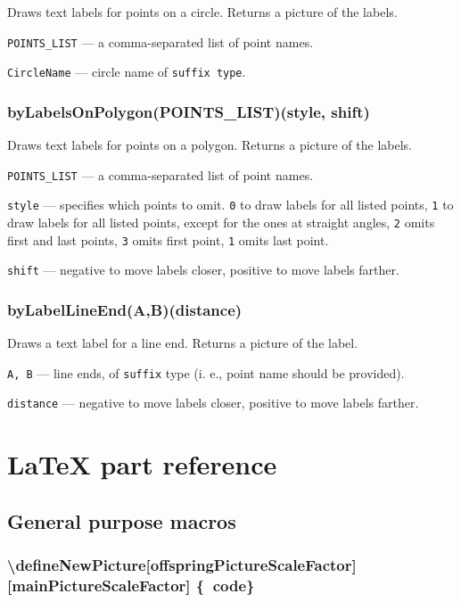 \documentclass{ltxdoc}
\begin{document}
	Draws text labels for points on a circle. Returns a picture of the labels.
	
	\texttt{POINTS\_LIST} — a comma-separated list of point names.
	
	\texttt{CircleName} — circle name of \texttt{suffix type}.

\subsubsection{byLabelsOnPolygon(POINTS\_LIST)(style, shift)}\label{byLabelsOnPolygon}
	
	Draws text labels for points on a polygon. Returns a picture of the labels.
	
	\texttt{POINTS\_LIST} — a comma-separated list of point names.
	
	\texttt{style} — specifies which points to omit. \texttt{0} to draw labels for all listed points, \texttt{1} to draw labels for all listed points, except for the ones at straight angles, \texttt{2} omits first and last points, \texttt{3} omits first point, \texttt{1} omits last point.
	
	\texttt{shift} — negative to move labels closer, positive to move labels farther.

\subsubsection{byLabelLineEnd(A,B)(distance)}\label{byLabelLineEnd}
	
	Draws a text label for a line end. Returns a picture of the label.
	
	\texttt{A, B} — line ends, of \texttt{suffix} type (i. e., point name should be provided).
	
	\texttt{distance} — negative to move labels closer, positive to move labels farther.


\section{LaTeX part reference}

\subsection{General purpose macros}

\subsubsection{\textbackslash defineNewPicture[offspringPictureScaleFactor] [mainPictureScaleFactor] \{\METAPOST\ code\}}
\end{document}
